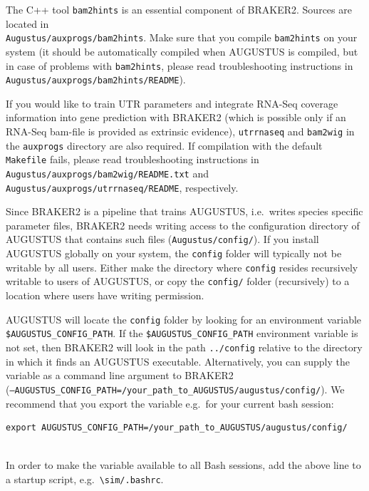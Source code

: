 \documentclass[]{article}
\begin{document}
The C++ tool \texttt{bam2hints} is an essential component of BRAKER2.
Sources are located in\\
\texttt{Augustus/auxprogs/bam2hints}. Make sure that you compile
\texttt{bam2hints} on your system (it should be automatically compiled
when AUGUSTUS is compiled, but in case of problems with
\texttt{bam2hints}, please read troubleshooting instructions in
\texttt{Augustus/auxprogs/bam2hints/README}).

If you would like to train UTR parameters and integrate RNA-Seq coverage
information into gene prediction with BRAKER2 (which is possible only if
an RNA-Seq bam-file is provided as extrinsic evidence),
\texttt{utrrnaseq} and \texttt{bam2wig} in the \texttt{auxprogs}
directory are also required. If compilation with the default
\texttt{Makefile} fails, please read troubleshooting instructions in
\texttt{Augustus/auxprogs/bam2wig/README.txt} and
\texttt{Augustus/auxprogs/utrrnaseq/README}, respectively.

Since BRAKER2 is a pipeline that trains AUGUSTUS, i.e.~writes species
specific parameter files, BRAKER2 needs writing access to the
configuration directory of AUGUSTUS that contains such files
(\texttt{Augustus/config/}). If you install AUGUSTUS globally on your
system, the \texttt{config} folder will typically not be writable by all
users. Either make the directory where \texttt{config} resides
recursively writable to users of AUGUSTUS, or copy the \texttt{config/}
folder (recursively) to a location where users have writing permission.

AUGUSTUS will locate the \texttt{config} folder by looking for an
environment variable \texttt{\$AUGUSTUS\_CONFIG\_PATH}. If the
\texttt{\$AUGUSTUS\_CONFIG\_PATH} environment variable is not set, then
BRAKER2 will look in the path \texttt{../config} relative to the
directory in which it finds an AUGUSTUS executable. Alternatively, you
can supply the variable as a command line argument to BRAKER2\\
(\texttt{–AUGUSTUS\_CONFIG\_PATH=/your\_path\_to\_AUGUSTUS/augustus/config/}).
We recommend that you export the variable e.g.~for your current bash
session:

\begin{verbatim}
export AUGUSTUS_CONFIG_PATH=/your_path_to_AUGUSTUS/augustus/config/
    
\end{verbatim}

In order to make the variable available to all Bash sessions, add the
above line to a startup script,
e.g.~\texttt{\textbackslash{}sim/.bashrc}.
\end{document}
